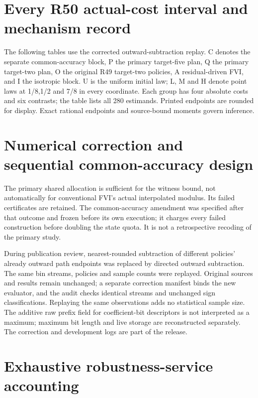 \documentclass[ecta,nameyear,draft]{econsocart}
\begin{document}
\section{Every R50 actual-cost interval and mechanism record}\label{supp:records50}
The following tables use the corrected outward-subtraction replay. C denotes the separate common-accuracy block, P the primary target-five plan, Q the primary target-two plan, O the original R49 target-two policies, A residual-driven FVI, and I the isotropic block. U is the uniform initial law; L, M and H denote point laws at 1/8,1/2 and 7/8 in every coordinate. Each group has four absolute costs and six contrasts; the table lists all 280 estimands. Printed endpoints are rounded for display. Exact rational endpoints and source-bound moments govern inference.





\section{Numerical correction and sequential common-accuracy design}\label{supp:corrections50}
The primary shared allocation is sufficient for the witness bound, not automatically for conventional FVI's actual interpolated modulus. Its failed certificates are retained. The common-accuracy amendment was specified after that outcome and frozen before its own execution; it charges every failed construction before doubling the state quota. It is not a retrospective recoding of the primary study.

During publication review, nearest-rounded subtraction of different policies' already outward path endpoints was replaced by directed outward subtraction. The same bin streams, policies and sample counts were replayed. Original sources and results remain unchanged; a separate correction manifest binds the new evaluator, and the audit checks identical streams and unchanged sign classifications. Replaying the same observations adds no statistical sample size. The additive raw prefix field for coefficient-bit descriptors is not interpreted as a maximum; maximum bit length and live storage are reconstructed separately. The correction and development logs are part of the release.

\section{Exhaustive robustness-service accounting}\label{supp:work52}



\end{document}
